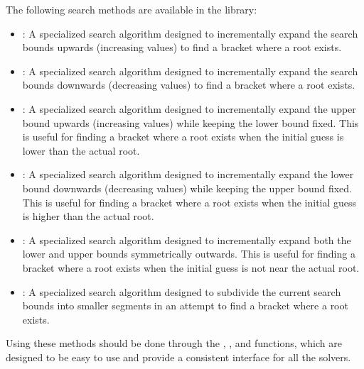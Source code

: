 \documentclass[letterpaper,10pt,english]{sphinxmanual}
\begin{document}
\sphinxAtStartPar
The following search methods are available in the library:
\begin{itemize}
\item {} 
\sphinxAtStartPar
{}: A specialized search algorithm designed to incrementally expand the search bounds upwards (increasing values) to find a bracket where a root exists.

\item {} 
\sphinxAtStartPar
{}: A specialized search algorithm designed to incrementally expand the search bounds downwards (decreasing values) to find a bracket where a root exists.

\item {} 
\sphinxAtStartPar
{}: A specialized search algorithm designed to incrementally expand the upper bound upwards (increasing values) while keeping the lower bound fixed. This is useful for finding a bracket where a root exists when the initial guess is lower than the actual root.

\item {} 
\sphinxAtStartPar
{}: A specialized search algorithm designed to incrementally expand the lower bound downwards (decreasing values) while keeping the upper bound fixed. This is useful for finding a bracket where a root exists when the initial guess is higher than the actual root.

\item {} 
\sphinxAtStartPar
{}: A specialized search algorithm designed to incrementally expand both the lower and upper bounds symmetrically outwards. This is useful for finding a bracket where a root exists when the initial guess is not near the actual root.

\item {} 
\sphinxAtStartPar
{}: A specialized search algorithm designed to subdivide the current search bounds into smaller segments in an attempt to find a bracket where a root exists.

\end{itemize}

\sphinxAtStartPar
Using these methods should be done through the , , and  functions, which are designed to be easy to use and provide a consistent interface for all the solvers.
\end{document}
